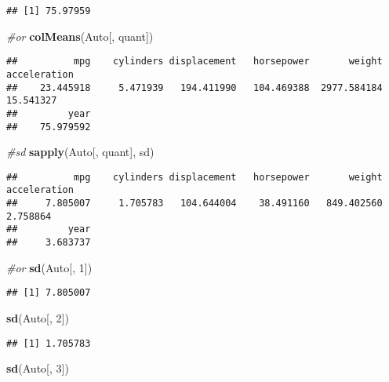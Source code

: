 \documentclass[
]{article}
\newenvironment{Shaded}{\begin{snugshade}}{\end{snugshade}}
\newcommand{\CommentTok}[1]{\textcolor[rgb]{0.56,0.35,0.01}{\textit{#1}}}
\newcommand{\DecValTok}[1]{\textcolor[rgb]{0.00,0.00,0.81}{#1}}
\newcommand{\FunctionTok}[1]{\textcolor[rgb]{0.13,0.29,0.53}{\textbf{#1}}}
\newcommand{\NormalTok}[1]{#1}
\begin{document}
\begin{verbatim}
## [1] 75.97959
\end{verbatim}

\begin{Shaded}
\begin{Highlighting}[]
\CommentTok{\#or}
\FunctionTok{colMeans}\NormalTok{(Auto[, quant])}
\end{Highlighting}
\end{Shaded}

\begin{verbatim}
##          mpg    cylinders displacement   horsepower       weight acceleration 
##    23.445918     5.471939   194.411990   104.469388  2977.584184    15.541327 
##         year 
##    75.979592
\end{verbatim}

\begin{Shaded}
\begin{Highlighting}[]
\CommentTok{\#sd}
\FunctionTok{sapply}\NormalTok{(Auto[, quant], sd)}
\end{Highlighting}
\end{Shaded}

\begin{verbatim}
##          mpg    cylinders displacement   horsepower       weight acceleration 
##     7.805007     1.705783   104.644004    38.491160   849.402560     2.758864 
##         year 
##     3.683737
\end{verbatim}

\begin{Shaded}
\begin{Highlighting}[]
\CommentTok{\#or}
\FunctionTok{sd}\NormalTok{(Auto[, }\DecValTok{1}\NormalTok{])}
\end{Highlighting}
\end{Shaded}

\begin{verbatim}
## [1] 7.805007
\end{verbatim}

\begin{Shaded}
\begin{Highlighting}[]
\FunctionTok{sd}\NormalTok{(Auto[, }\DecValTok{2}\NormalTok{])}
\end{Highlighting}
\end{Shaded}

\begin{verbatim}
## [1] 1.705783
\end{verbatim}

\begin{Shaded}
\begin{Highlighting}[]
\FunctionTok{sd}\NormalTok{(Auto[, }\DecValTok{3}\NormalTok{])}
\end{Highlighting}
\end{Shaded}
\end{document}
